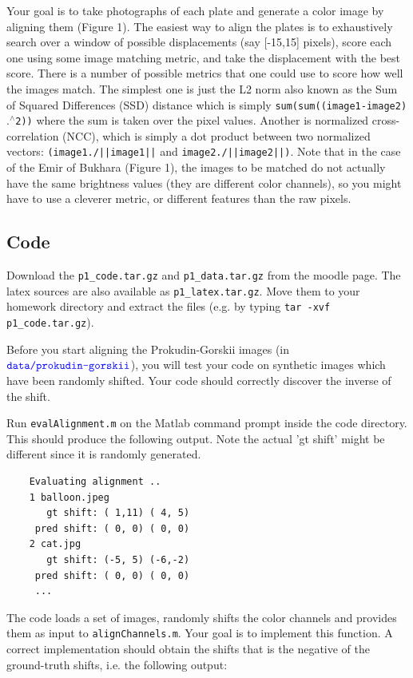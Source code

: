 \documentclass[10pt,letterpaper]{article}
\newcommand{\cmd}[1] {{\color{blue}\texttt{#1}}}
\begin{document}
Your goal is to take photographs of each plate and generate a color image by aligning them (Figure 1). The easiest way to align the plates is to exhaustively search over a window of possible displacements (say [-15,15] pixels), score each one using some image matching metric, and take the displacement with the best score. There is a number of possible metrics that one could use to score how well the images match. The simplest one is just the L2 norm also known as the Sum of Squared Differences (SSD) distance which is simply \cmd{sum(sum((image1-image2)$.^\wedge$2))} where the sum is taken over the pixel values. Another is normalized cross-correlation (NCC), which is simply a dot product between two normalized vectors: \cmd{(image1./||image1||} and \cmd{image2./||image2||)}. Note that in the case of the Emir of Bukhara (Figure 1), the images to be matched do not actually have the same brightness values (they are different color channels), so you might have to use a cleverer metric, or different features than the raw pixels.

\subsection{Code}
Download the \cmd{p1\_code.tar.gz} and \cmd{p1\_data.tar.gz} from the moodle page. The latex sources are also available as \cmd{p1\_latex.tar.gz}. Move them to your homework directory and extract the files (e.g. by typing \cmd{tar -xvf p1\_code.tar.gz}). 

Before you start aligning the Prokudin-Gorskii images (in $\cmd{data/prokudin-gorskii}$), you will test your code on synthetic images which have been randomly shifted. Your code should correctly discover the inverse of the shift.

Run \cmd{evalAlignment.m} on the Matlab command prompt inside the code directory. This should produce the following output. Note the actual 'gt shift' might be different since it is randomly generated.
\begin{verbatim}
    Evaluating alignment ..
    1 balloon.jpeg
	   gt shift: ( 1,11) ( 4, 5)
	 pred shift: ( 0, 0) ( 0, 0)
    2 cat.jpg
	   gt shift: (-5, 5) (-6,-2)
	 pred shift: ( 0, 0) ( 0, 0)
     ...
\end{verbatim}
    
The code loads a set of images, randomly shifts the color channels and provides them as input to \cmd{alignChannels.m}. Your goal is to implement this function. A correct implementation should obtain the shifts that is the negative of the ground-truth shifts, i.e. the following output:
\end{document}
